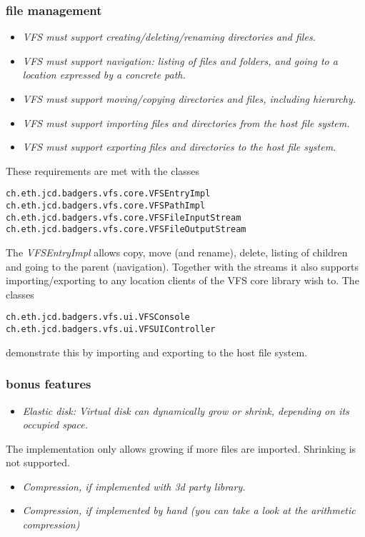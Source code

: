 \subsubsection{file management}
\begin{itemize}
  \item \emph{VFS must support creating/deleting/renaming directories and files.}
  \item \emph{VFS must support navigation: listing of files and folders, and
  going to a location expressed by a concrete path.}
  \item \emph{VFS must support moving/copying directories and files, including
  hierarchy.}
  \item \emph{VFS must support importing files and directories from
  the host file system.}
  \item \emph{VFS must support exporting files and directories to the host file
  system.}
\end{itemize} These requirements are met with the classes
\begin{verbatim}
ch.eth.jcd.badgers.vfs.core.VFSEntryImpl
ch.eth.jcd.badgers.vfs.core.VFSPathImpl
ch.eth.jcd.badgers.vfs.core.VFSFileInputStream
ch.eth.jcd.badgers.vfs.core.VFSFileOutputStream
\end{verbatim}The \textit{VFSEntryImpl} allows
copy, move (and rename), delete, listing of children and going to the parent
(navigation). Together with the streams it also supports importing/exporting
to any location clients of the VFS core library wish to. The classes
\begin{verbatim}
ch.eth.jcd.badgers.vfs.ui.VFSConsole
ch.eth.jcd.badgers.vfs.ui.VFSUIController
\end{verbatim} demonstrate this by importing and exporting to the host file
system.

\subsubsection {bonus features}
\begin{itemize}
  \item \emph{Elastic disk: Virtual disk can dynamically grow or shrink,
  depending on its occupied space.}
\end{itemize}
The implementation only allows growing if more files are imported. Shrinking is
not supported.

\begin{itemize}
  \item \emph{Compression, if implemented with 3d party library.}
  \item \emph{Compression, if implemented by hand (you can take a look at
  the arithmetic compression)}
\end{itemize}

